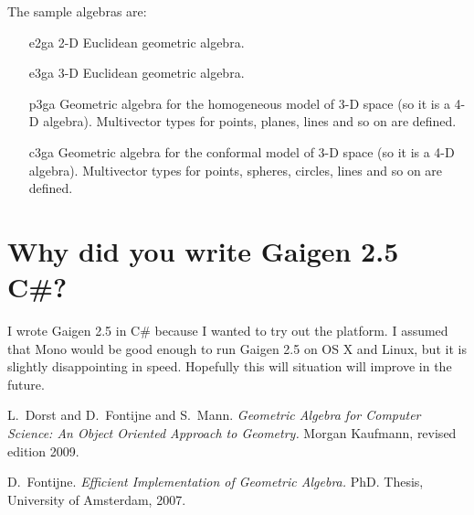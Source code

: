 \documentclass[10pt, a4paper]{article}
\begin{document}
The sample algebras are:
\begin{itemize}
\item[e2ga] 2-D Euclidean geometric algebra.
\item[e3ga] 3-D Euclidean geometric algebra.
\item[p3ga] Geometric algebra for the homogeneous model of 3-D space (so it is a 4-D algebra).
Multivector types for points, planes, lines and so on are defined.
\item[c3ga] Geometric algebra for the conformal model of 3-D space (so it is a 4-D algebra).
Multivector types for points, spheres, circles, lines and so on are defined.
\end{itemize}



\section{Why did you write Gaigen 2.5 C\#?}

I wrote Gaigen 2.5 in C\# because I wanted to try out the platform.
I assumed that Mono would be good enough to run Gaigen 2.5 on OS X and
Linux, but it is slightly disappointing in speed. Hopefully this will
situation will improve in the future.


\begin{thebibliography}{}


	
 L.~Dorst and D.~Fontijne and S.~Mann.
	\emph{Geometric Algebra for Computer Science: An Object Oriented Approach to Geometry.}
	Morgan Kaufmann, revised edition 2009.

 D.~Fontijne.
	\emph{Efficient Implementation of Geometric Algebra.}
	PhD. Thesis, University of Amsterdam, 2007.


\end{thebibliography}
\end{document}
